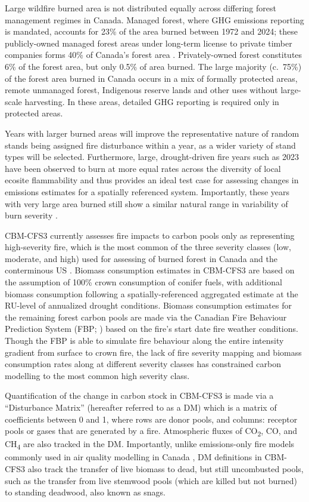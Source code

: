 \documentclass[, manuscript]{copernicus}
\begin{document}
Large wildfire burned area is not distributed equally across differing
forest management regimes in Canada. Managed forest, where GHG emissions
reporting is mandated, accounts for 23\% of the area burned between 1972
and 2024; these publicly-owned managed forest areas under long-term
license to private timber companies forms 40\% of Canada's forest area
\citep{stinson2019}. Privately-owned forest constitutes 6\% of the
forest area, but only 0.5\% of area burned. The large majority (c.~75\%)
of the forest area burned in Canada occurs in a mix of formally
protected areas, remote unmanaged forest, Indigenous reserve lands and
other uses without large-scale harvesting. In these areas, detailed GHG
reporting is required only in protected areas.

Years with larger burned areas will improve the representative nature of
random stands being assigned fire disturbance within a year, as a wider
variety of stand types will be selected. Furthermore, large,
drought-driven fire years such as 2023 have been observed to burn at
more equal rates across the diversity of local ecosite flammability
\citep{parks2018, whitman2024} and thus provides an ideal test case for
assessing changes in emissions estimates for a spatially referenced
system. Importantly, these years with very large area burned still show
a similar natural range in variability of burn severity
\citep{whitman2018}.

CBM-CFS3 currently assesses fire impacts to carbon pools only as
representing high-severity fire, which is the most common of the three
severity classes (low, moderate, and high) used for assessing of burned
forest in Canada \citep{hall2008} and the conterminous US
\citep{eidenshink2007}. Biomass consumption estimates in CBM-CFS3 are
based on the assumption of 100\% crown consumption of conifer fuels,
with additional biomass consumption following a spatially-referenced
aggregated estimate at the RU-level of annualized drought conditions.
Biomass consumption estimates for the remaining forest carbon pools are
made via the Canadian Fire Behaviour Prediction System (FBP;
\citet{forestrycanadafiredangerratinggroup1992}) based on the fire's
start date fire weather conditions. Though the FBP is able to simulate
fire behaviour along the entire intensity gradient from surface to crown
fire, the lack of fire severity mapping and biomass consumption rates
along at different severity classes has constrained carbon modelling to
the most common high severity class.

Quantification of the change in carbon stock in CBM-CFS3 is made via a
``Disturbance Matrix'' (hereafter referred to as a DM) which is a matrix
of coefficients between 0 and 1, where rows are donor pools, and
columns: receptor pools or gases that are generated by a fire.
Atmospheric fluxes of CO\textsubscript{2}, CO, and CH\textsubscript{4}
are also tracked in the DM. Importantly, unlike emissions-only fire
models commonly used in air quality modelling in Canada
\citep{chen2019}, DM definitions in CBM-CFS3 also track the transfer of
live biomass to dead, but still uncombusted pools, such as the transfer
from live stemwood pools (which are killed but not burned) to standing
deadwood, also known as snags.
\end{document}
